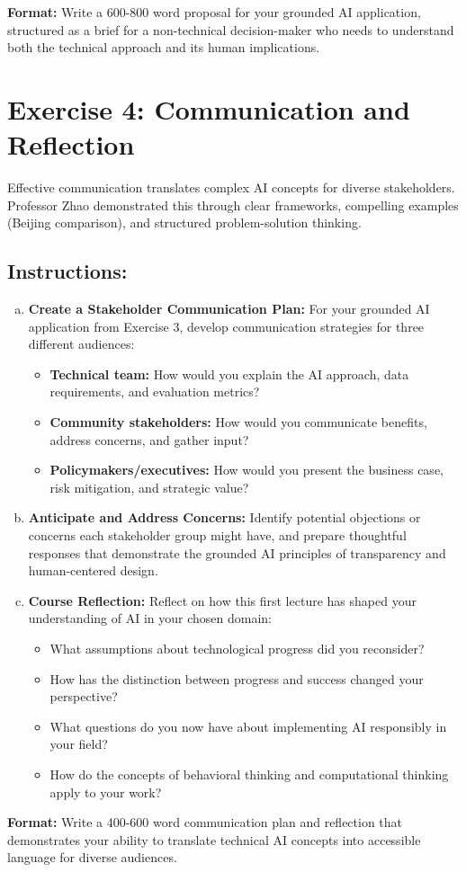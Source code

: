 \documentclass[11pt]{article}
\begin{document}
\textbf{Format:} Write a 600-800 word proposal for your grounded AI application, structured as a brief for a non-technical decision-maker who needs to understand both the technical approach and its human implications.

\section*{Exercise 4: Communication and Reflection}

Effective communication translates complex AI concepts for diverse stakeholders. Professor Zhao demonstrated this through clear frameworks, compelling examples (Beijing comparison), and structured problem-solution thinking.

\subsection{Instructions:}
\begin{enumerate}[(a)]
\item \textbf{Create a Stakeholder Communication Plan:} For your grounded AI application from Exercise 3, develop communication strategies for three different audiences:
\begin{itemize}
\item \textbf{Technical team:} How would you explain the AI approach, data requirements, and evaluation metrics?
\item \textbf{Community stakeholders:} How would you communicate benefits, address concerns, and gather input?
\item \textbf{Policymakers/executives:} How would you present the business case, risk mitigation, and strategic value?
\end{itemize}

\item \textbf{Anticipate and Address Concerns:} Identify potential objections or concerns each stakeholder group might have, and prepare thoughtful responses that demonstrate the grounded AI principles of transparency and human-centered design.

\item \textbf{Course Reflection:} Reflect on how this first lecture has shaped your understanding of AI in your chosen domain:
\begin{itemize}
\item What assumptions about technological progress did you reconsider?
\item How has the distinction between progress and success changed your perspective?
\item What questions do you now have about implementing AI responsibly in your field?
\item How do the concepts of behavioral thinking and computational thinking apply to your work?
\end{itemize}
\end{enumerate}

\textbf{Format:} Write a 400-600 word communication plan and reflection that demonstrates your ability to translate technical AI concepts into accessible language for diverse audiences.
\end{document}
